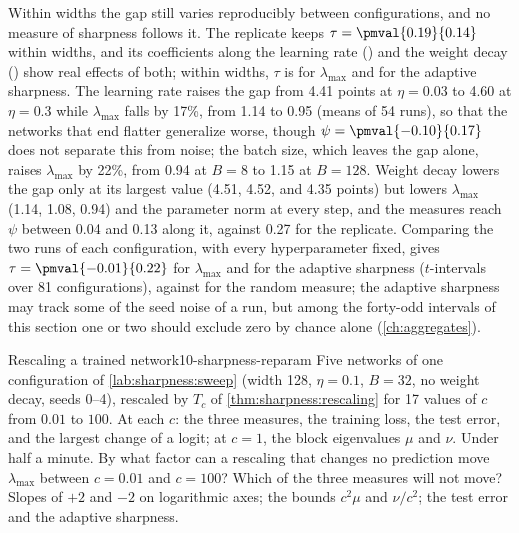 \begin{refsection}
Within widths the gap still varies reproducibly between configurations, and no measure of sharpness follows it. The replicate keeps $\tau=\pmval{0.19}{0.14}$ within widths, and its coefficients along the learning rate () and the weight decay () show real effects of both; within widths, $\tau$ is  for $\lambda_{\max}$ and  for the adaptive sharpness. The learning rate raises the gap from 4.41 points at $\eta=0.03$ to 4.60 at $\eta=0.3$ while $\lambda_{\max}$ falls by 17\%, from 1.14 to 0.95 (means of 54 runs), so that the networks that end flatter generalize worse, though $\psi=\pmval{-0.10}{0.17}$ does not separate this from noise; the batch size, which leaves the gap alone, raises $\lambda_{\max}$ by 22\%, from 0.94 at $B=8$ to 1.15 at $B=128$. Weight decay lowers the gap only at its largest value (4.51, 4.52, and 4.35 points) but lowers $\lambda_{\max}$ (1.14, 1.08, 0.94) and the parameter norm at every step, and the measures reach $\psi$ between 0.04 and 0.13 along it, against 0.27 for the replicate. Comparing the two runs of each configuration, with every hyperparameter fixed, gives $\tau=\pmval{-0.01}{0.22}$ for $\lambda_{\max}$ and  for the adaptive sharpness ($t$-intervals over 81 configurations), against  for the random measure; the adaptive sharpness may track some of the seed noise of a run, but among the forty-odd intervals of this section one or two should exclude zero by chance alone (\cref{ch:aggregates}).

\begin{lab}{Rescaling a trained network}{10-sharpness-reparam}\label{lab:sharpness:reparam}
 Five networks of one configuration of \cref{lab:sharpness:sweep} (width 128, $\eta=0.1$, $B=32$, no weight decay, seeds 0--4), rescaled by $T_c$ of \cref{thm:sharpness:rescaling} for 17 values of $c$ from $0.01$ to $100$. At each $c$: the three measures, the training loss, the test error, and the largest change of a logit; at $c=1$, the block eigenvalues $\mu$ and $\nu$. Under half a minute.
 By what factor can a rescaling that changes no prediction move $\lambda_{\max}$ between $c=0.01$ and $c=100$? Which of the three measures will not move?
 Slopes of $+2$ and $-2$ on logarithmic axes; the bounds $c^2\mu$ and $\nu/c^2$; the test error and the adaptive sharpness.
\end{lab}


\end{refsection}
